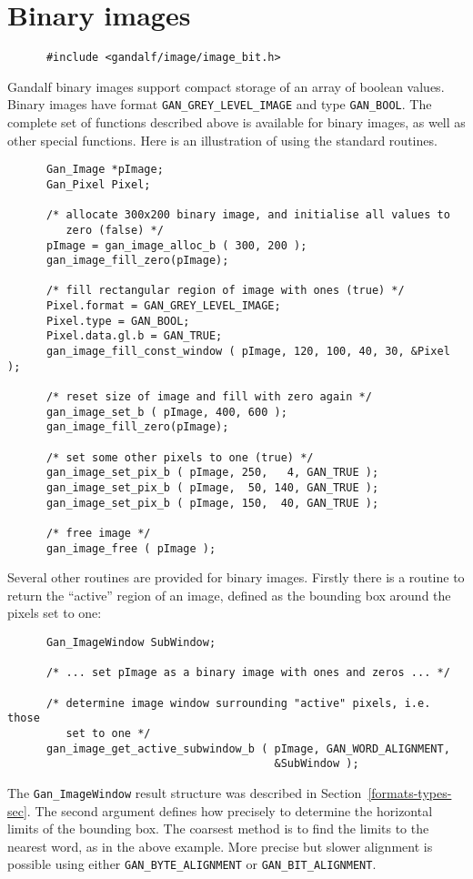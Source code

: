 \section{Binary images} \label{binary-image-sec}
\begin{verbatim}
      #include <gandalf/image/image_bit.h>
\end{verbatim}
Gandalf binary images support compact storage of an array of boolean values.
Binary images have format {\tt GAN\_GREY\_LEVEL\_IMAGE} and type
{\tt GAN\_BOOL}. The complete set of functions described above is
available for binary images, as well as other special functions.
Here is an illustration of using the standard routines.
\begin{verbatim}
      Gan_Image *pImage;
      Gan_Pixel Pixel;

      /* allocate 300x200 binary image, and initialise all values to
         zero (false) */
      pImage = gan_image_alloc_b ( 300, 200 );
      gan_image_fill_zero(pImage);

      /* fill rectangular region of image with ones (true) */
      Pixel.format = GAN_GREY_LEVEL_IMAGE;
      Pixel.type = GAN_BOOL;
      Pixel.data.gl.b = GAN_TRUE;
      gan_image_fill_const_window ( pImage, 120, 100, 40, 30, &Pixel );

      /* reset size of image and fill with zero again */
      gan_image_set_b ( pImage, 400, 600 );
      gan_image_fill_zero(pImage);

      /* set some other pixels to one (true) */
      gan_image_set_pix_b ( pImage, 250,   4, GAN_TRUE );
      gan_image_set_pix_b ( pImage,  50, 140, GAN_TRUE );
      gan_image_set_pix_b ( pImage, 150,  40, GAN_TRUE );

      /* free image */
      gan_image_free ( pImage );
\end{verbatim}

Several other routines are provided for binary images. Firstly there is
a routine to return the ``active'' region of an image, defined as the
bounding box around the pixels set to one:
\begin{verbatim}
      Gan_ImageWindow SubWindow;

      /* ... set pImage as a binary image with ones and zeros ... */

      /* determine image window surrounding "active" pixels, i.e. those
         set to one */
      gan_image_get_active_subwindow_b ( pImage, GAN_WORD_ALIGNMENT,
                                         &SubWindow );
\end{verbatim}
The {\tt Gan\_ImageWindow} result structure was described in
Section~\ref{formats-types-sec}. The second argument defines how
precisely to determine the horizontal limits of the bounding box.
The coarsest method is to find the limits to the nearest word, as in the
above example. More precise but slower alignment is possible using
either {\tt GAN\_BYTE\_ALIGNMENT} or {\tt GAN\_BIT\_ALIGNMENT}.

